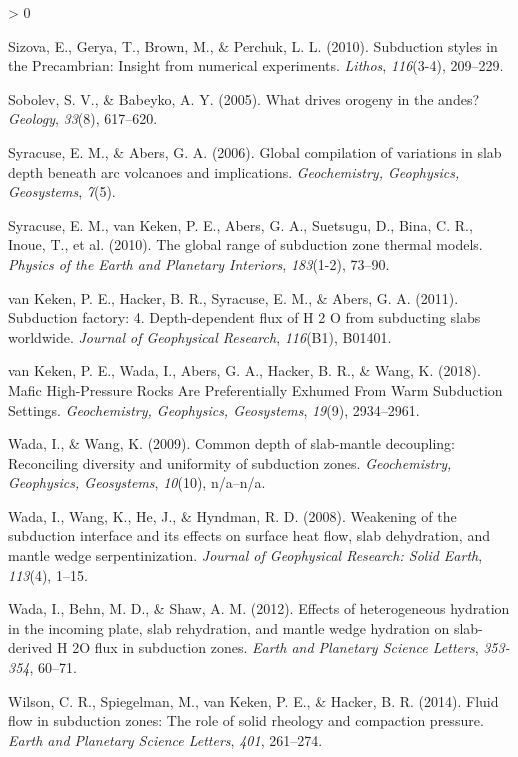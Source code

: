 \documentclass[draft,linenumbers]{agujournal2018}
\newlength{\cslhangindent}
\newenvironment{CSLReferences}[2] %
 {%
  \setlength{\parindent}{0pt}
  \ifodd #1 \everypar{\setlength{\hangindent}{\cslhangindent}}\ignorespaces\fi
  \ifnum #2 > 0
  \setlength{\parskip}{#2\baselineskip}
  \fi
 }%
 {}
\providecommand{\DIFaddbegin}{} %
\providecommand{\DIFaddend}{} %
\providecommand{\DIFdelbegin}{} %
\providecommand{\DIFdelend}{} %
\begin{document}
\begin{CSLReferences}{1}{0}
\leavevmode{}%
Sizova, E., Gerya, T., Brown, M., \& Perchuk, L. L. (2010). {Subduction
styles in the Precambrian: Insight from numerical experiments}.
\emph{Lithos}, \emph{116}(3-4), 209--229.

\leavevmode{}%
Sobolev, S. V., \& Babeyko, A. Y. (2005). What drives orogeny in the
andes? \emph{Geology}, \emph{33}(8), 617--620.

\leavevmode{}%
Syracuse, E. M., \& Abers, G. A. (2006). {Global compilation of
variations in slab depth beneath arc volcanoes and implications}.
\emph{Geochemistry, Geophysics, Geosystems}, \emph{7}(5).

\leavevmode{}%
Syracuse, E. M., van Keken, P. E., Abers, G. A., Suetsugu, D., Bina, C.
R., Inoue, T., et al. (2010). {The global range of subduction zone
thermal models}. \emph{Physics of the Earth and Planetary Interiors},
\emph{183}(1-2), 73--90.

\leavevmode{}%
van Keken, P. E., Hacker, B. R., Syracuse, E. M., \& Abers, G. A.
(2011). {Subduction factory: 4. Depth-dependent flux of H 2 O from
subducting slabs worldwide}. \emph{Journal of Geophysical Research},
\emph{116}(B1), B01401.

\leavevmode{}%
van Keken, P. E., Wada, I., Abers, G. A., Hacker, B. R., \& Wang, K.
(2018). {Mafic High-Pressure Rocks Are Preferentially Exhumed From Warm
Subduction Settings}. \emph{Geochemistry, Geophysics, Geosystems},
\emph{19}(9), 2934--2961.

\leavevmode{}%
Wada, I., \& Wang, K. (2009). {Common depth of slab-mantle decoupling:
Reconciling diversity and uniformity of subduction zones}.
\emph{Geochemistry, Geophysics, Geosystems}, \emph{10}(10), n/a--n/a.

\leavevmode{}%
Wada, I., Wang, K., He, J., \& Hyndman, R. D. (2008). {Weakening of the
subduction interface and its effects on surface heat flow, slab
dehydration, and mantle wedge serpentinization}. \emph{Journal of
Geophysical Research: Solid Earth}, \emph{113}(4), 1--15.

\leavevmode{}%
Wada, I., Behn, M. D., \& Shaw, A. M. (2012). {Effects of heterogeneous
hydration in the incoming plate, slab rehydration, and mantle wedge
hydration on slab-derived H 2O flux in subduction zones}. \emph{Earth
and Planetary Science Letters}, \emph{353-354}, 60--71.

\leavevmode{}%
Wilson, C. R., Spiegelman, M., van Keken, P. E., \& Hacker, B. R.
(2014). {Fluid flow in subduction zones: The role of solid rheology and
compaction pressure}. \emph{Earth and Planetary Science Letters},
\emph{401}, 261--274.

\end{CSLReferences}

\DIFdelbegin %
\DIFdelend \DIFaddbegin 
\DIFaddend 
\end{document}
